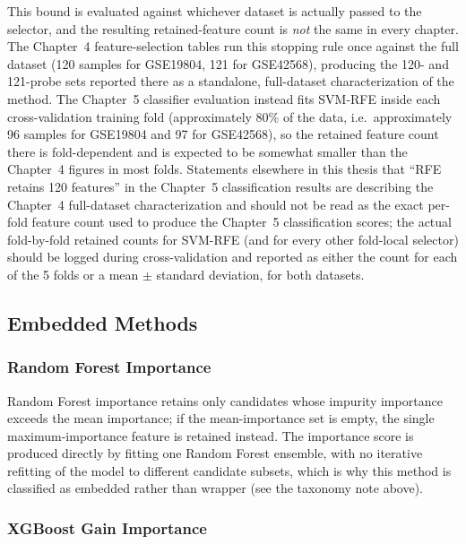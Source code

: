 This bound is evaluated against whichever dataset is actually passed to the selector, and the resulting retained-feature count is \emph{not} the same in every chapter. The Chapter~4 feature-selection tables run this stopping rule once against the full dataset (120 samples for GSE19804, 121 for GSE42568), producing the 120- and 121-probe sets reported there as a standalone, full-dataset characterization of the method. The Chapter~5 classifier evaluation instead fits SVM-RFE inside each cross-validation training fold (approximately 80\% of the data, i.e.\ approximately 96 samples for GSE19804 and 97 for GSE42568), so the retained feature count there is fold-dependent and is expected to be somewhat smaller than the Chapter~4 figures in most folds. Statements elsewhere in this thesis that ``RFE retains 120 features'' in the Chapter~5 classification results are describing the Chapter~4 full-dataset characterization and should not be read as the exact per-fold feature count used to produce the Chapter~5 classification scores; the actual fold-by-fold retained counts for SVM-RFE (and for every other fold-local selector) should be logged during cross-validation and reported as either the count for each of the 5 folds or a mean $\pm$ standard deviation, for both datasets.

\subsection{Embedded Methods}
\label{sec:embedded}

\subsubsection{Random Forest Importance}

Random Forest importance retains only candidates whose impurity importance exceeds the mean importance; if the mean-importance set is empty, the single maximum-importance feature is retained instead. The importance score is produced directly by fitting one Random Forest ensemble, with no iterative refitting of the model to different candidate subsets, which is why this method is classified as embedded rather than wrapper (see the taxonomy note above).

\subsubsection{XGBoost Gain Importance}

